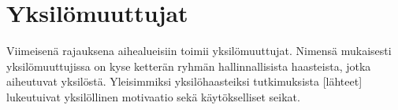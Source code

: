 \chapter{Yksilömuuttujat}

Viimeisenä rajauksena aihealueisiin toimii yksilömuuttujat. Nimensä mukaisesti yksilömuuttujissa on kyse ketterän ryhmän hallinnallisista haasteista, jotka aiheutuvat yksilöstä. Yleisimmiksi yksilöhaasteiksi tutkimuksista [lähteet] lukeutuivat yksilöllinen motivaatio sekä käytökselliset seikat.